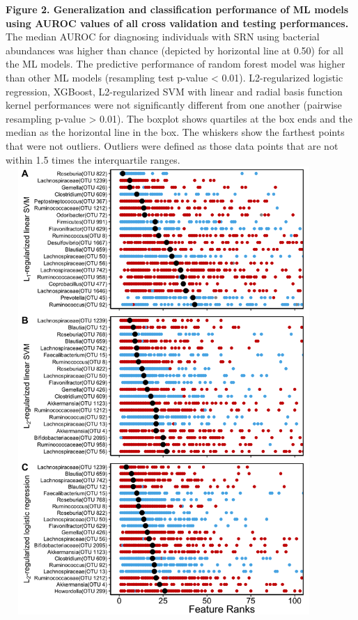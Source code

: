 \documentclass[11pt,]{article}
\begin{document}
\textbf{Figure 2. Generalization and classification performance of ML
models using AUROC values of all cross validation and testing
performances.} The median AUROC for diagnosing individuals with SRN
using bacterial abundances was higher than chance (depicted by
horizontal line at 0.50) for all the ML models. The predictive
performance of random forest model was higher than other ML models
(resampling test p-value \textless{} 0.01). L2-regularized logistic
regression, XGBoost, L2-regularized SVM with linear and radial basis
function kernel performances were not significantly different from one
another (pairwise resampling p-value \textgreater{} 0.01). The boxplot
shows quartiles at the box ends and the median as the horizontal line in
the box. The whiskers show the farthest points that were not outliers.
Outliers were defined as those data points that are not within 1.5 times
the interquartile ranges. \newpage
\includegraphics[height=17cm, width=12cm]{Figure_3.png}
\end{document}
